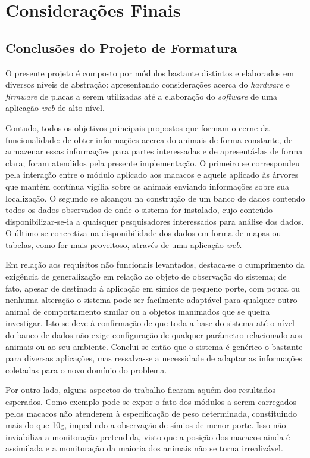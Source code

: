\chapter{Considerações Finais}

\section{Conclusões do Projeto de Formatura}
O presente projeto é composto por módulos bastante distintos e elaborados em diversos níveis de abstração: apresentando considerações acerca do \emph{hardware} e \emph{firmware} de placas a serem utilizadas até a elaboração do \emph{software} de uma aplicação \emph{web} de alto nível.

Contudo, todos os objetivos principais propostos que formam o cerne da funcionalidade: de obter informações acerca do animais de forma constante, de armazenar essas informações para partes interessadas e de apresentá-las de forma clara; foram atendidos pela presente implementação. O primeiro se correspondeu pela interação entre o módulo aplicado aos macacos e aquele aplicado às árvores que mantém contínua vigília sobre os animais enviando informações sobre sua localização. O segundo se alcançou na construção de um banco de dados contendo todos os dados observados de onde o sistema for instalado, cujo conteúdo disponibilizar-se-ia a quaisquer pesquisadores interessados para análise dos dados. O último se concretiza na disponibilidade dos dados em forma de mapas ou tabelas, como for mais proveitoso, através de uma aplicação \emph{web}.

Em relação aos requisitos não funcionais levantados, destaca-se o cumprimento da exigência de generalização em relação ao objeto de observação do sistema; de fato, apesar de destinado à aplicação em símios de pequeno porte, com pouca ou nenhuma alteração o sistema pode ser facilmente adaptável para qualquer outro animal de comportamento similar ou a objetos inanimados que se queira investigar. Isto se deve à confirmação de que toda a base do sistema até o nível do banco de dados não exige configuração de qualquer parâmetro relacionado aos animais ou ao seu ambiente. Conclui-se então que o sistema é genérico o bastante para diversas aplicações, mas ressalva-se a necessidade de adaptar as informações coletadas para o novo domínio do problema.

Por outro lado, alguns aspectos do trabalho ficaram aquém dos resultados esperados. Como exemplo pode-se expor o fato dos módulos a serem carregados pelos macacos não atenderem à especificação de peso determinada, constituindo mais do que 10g, impedindo a observação de símios de menor porte. Isso não inviabiliza a monitoração pretendida, visto que a posição dos macacos ainda é assimilada e a monitoração da maioria dos animais não se torna irrealizável.

